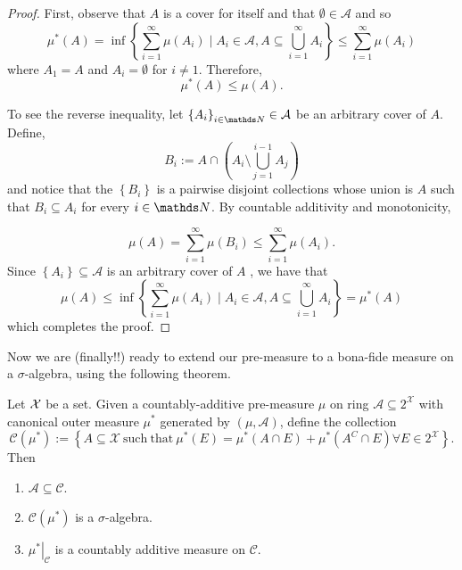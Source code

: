 \begin{proof}
First, observe that $A$ is a cover for itself and that $\emptyset\in\mathcal{A}$
and so 
\[
\mu^{*}\left(A\right)=\inf\left\{ \sum_{i=1}^{\infty}\mu(A_{i})\mid A_{i}\in\mathcal{A},A\subseteq\bigcup_{i=1}^{\infty}A_{i}\right\} \leq\sum_{i=1}^{\infty}\mu(A_{i})
\]
where $A_{1}=A$ and $A_{i}=\emptyset$ for $i\neq1.$ Therefore,
\[
\mu^{*}\left(A\right)\leq\mu\left(A\right).
\]

To see the reverse inequality, let $\left\{ A_{i}\right\} _{i\in\N}\in\mathcal{A}$
be an arbitrary cover of $A.$ Define,
\[
B_{i}:=A\cap\left(A_{i}\setminus\bigcup_{j=1}^{i-1}A_{j}\right)
\]
and notice that the $\left\{ B_{i}\right\} $ is a pairwise disjoint
collections whose union is $A$ such that $B_{i}\subseteq A_{i}$
for every $i\in\N$. By countable additivity and monotonicity,

\[
\mu\left(A\right)=\sum_{i=1}^{\infty}\mu\left(B_{i}\right)\leq\sum_{i=1}^{\infty}\mu\left(A_{i}\right).
\]
Since $\left\{ A_{i}\right\} \subseteq\mathcal{A}$ is an arbitrary
cover of $A$ , we have that
\[
\mu\left(A\right)\leq\inf\left\{ \sum_{i=1}^{\infty}\mu\left(A_{i}\right)\mid A_{i}\in\mathcal{A},A\subseteq\bigcup_{i=1}^{\infty}A_{i}\right\} =\mu^{*}\left(A\right)
\]
which completes the proof.
\end{proof}
Now we are (finally!!) ready to extend our pre-measure to a bona-fide
measure on a $\sigma$-algebra, using the following theorem.
\begin{thm}
\label{thm:caratheodoryExtn}Let $\mathcal{X}$ be a set. Given a countably-additive
pre-measure $\mu$ on ring $\mathcal{A\subseteq}2^{\mathcal{X}}$
with canonical outer measure $\mu^{*}$ generated by $\left(\mu,\mathcal{A}\right)$,
define the collection 
\[
\mathcal{C}\left(\mu^{*}\right):=\left\{ A\subseteq\mathcal{X}\mathrm{\ such\ that\ }\mu^{*}\left(E\right)=\mu^{*}\left(A\cap E\right)+\mu^{*}\left(A^{C}\cap E\right)\forall E\in2^{\mathcal{X}}\right\} .
\]
Then

\begin{enumerate}[label=(\roman*),leftmargin=.1\linewidth,rightmargin=.4\linewidth]
	\item $ \mathcal{A}\subseteq \mathcal{C}$.
	\item $ \mathcal{C}\left(\mu^*\right) $ is a $\sigma$-algebra.
	\item $\left.\mu^*\right|_{\mathcal{C}}$ is a countably additive measure on $\mathcal{C}$. 
\end{enumerate}
\end{thm}

